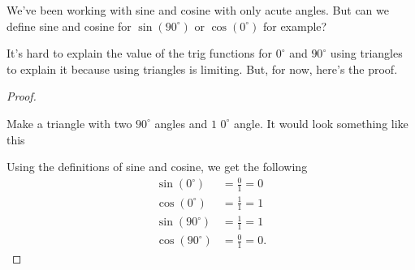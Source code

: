 We've been working with sine and cosine with only acute angles. But can we
define sine and cosine for $\sin(90^{\circ})$ or $\cos(0^{\circ})$ for example?

It's hard to explain the value of the trig functions for $0^{\circ}$ and
$90^{\circ}$ using triangles to explain it because using triangles is limiting.
But, for now, here's the proof.

\begin{proof}
  \label{prf:sin_90_equals_1}

  Make a triangle with two $90^{\circ}$ angles and $1$ $0^{\circ}$ angle.
  It would look something like this
  \begin{figure}[H]
    \centering


    \label{fig:sin_90_equals_1}
  \end{figure}

  Using the definitions of sine and cosine, we get the following
  \begin{align*}
    \sin(0^{\circ}) &= \frac{0}{1} = 0 \\
    \cos(0^{\circ}) &= \frac{1}{1} = 1 \\
    \sin(90^{\circ}) &= \frac{1}{1} = 1 \\
    \cos(90^{\circ}) &= \frac{0}{1} = 0
  .\end{align*}
\end{proof}




\newpage
